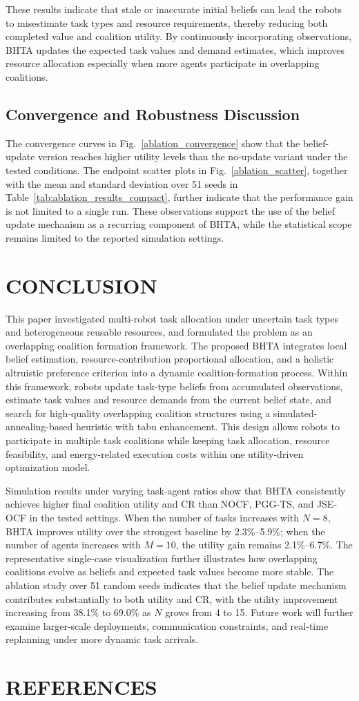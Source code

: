 \documentclass[journal,twoside,web]{ieeecolor}
\begin{document}
These results indicate that stale or inaccurate initial beliefs can lead the robots to misestimate task types and resource requirements, thereby reducing both completed value and coalition utility. By continuously incorporating observations, BHTA updates the expected task values and demand estimates, which improves resource allocation especially when more agents participate in overlapping coalitions.

\subsection{Convergence and Robustness Discussion}

The convergence curves in Fig.~\ref{ablation_convergence} show that the belief-update version reaches higher utility levels than the no-update variant under the tested conditions. The endpoint scatter plots in Fig.~\ref{ablation_scatter}, together with the mean and standard deviation over 51 seeds in Table~\ref{tab:ablation_results_compact}, further indicate that the performance gain is not limited to a single run. These observations support the use of the belief update mechanism as a recurring component of BHTA, while the statistical scope remains limited to the reported simulation settings.
\section{CONCLUSION}

This paper investigated multi-robot task allocation under uncertain task types and heterogeneous reusable resources, and formulated the problem as an overlapping coalition formation framework. The proposed BHTA integrates local belief estimation, resource-contribution proportional allocation, and a holistic altruistic preference criterion into a dynamic coalition-formation process. Within this framework, robots update task-type beliefs from accumulated observations, estimate task values and resource demands from the current belief state, and search for high-quality overlapping coalition structures using a simulated-annealing-based heuristic with tabu enhancement. This design allows robots to participate in multiple task coalitions while keeping task allocation, resource feasibility, and energy-related execution costs within one utility-driven optimization model.

Simulation results under varying task-agent ratios show that BHTA consistently achieves higher final coalition utility and CR than NOCF, PGG-TS, and JSE-OCF in the tested settings. When the number of tasks increases with $N=8$, BHTA improves utility over the strongest baseline by 2.3\%--5.9\%; when the number of agents increases with $M=10$, the utility gain remains 2.1\%--6.7\%. The representative single-case visualization further illustrates how overlapping coalitions evolve as beliefs and expected task values become more stable. The ablation study over 51 random seeds indicates that the belief update mechanism contributes substantially to both utility and CR, with the utility improvement increasing from 38.1\% to 69.0\% as $N$ grows from 4 to 15. Future work will further examine larger-scale deployments, communication constraints, and real-time replanning under more dynamic task arrivals.

\section{REFERENCES}



\end{document}
